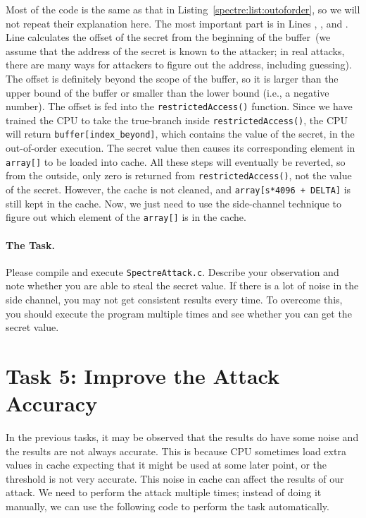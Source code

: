Most of the code is the same as that in Listing~\ref{spectre:list:outoforder}, so
we will not repeat their explanation here. The most important part is 
in Lines , , and . Line 
calculates the offset of the secret from the beginning of the buffer~(we assume that 
the address of the secret is known to the attacker; in real attacks, there are many ways for 
attackers to figure out the address, including guessing).
The offset is definitely beyond the scope of the buffer, so
it is larger than the upper bound of the buffer or smaller than the 
lower bound (i.e., a negative number). The offset
is fed into the \texttt{restrictedAccess()} function.
Since we have trained the CPU to take the true-branch inside
\texttt{restrictedAccess()}, the CPU will return \texttt{buffer[index\_beyond]}, which contains
the value of the secret, in the out-of-order execution. 
The secret value then causes its corresponding element in \texttt{array[]} to
be loaded into cache. All these steps will eventually be reverted, so 
from the outside, only zero is returned from \texttt{restrictedAccess()}, not the value of the secret.
However, the cache is not cleaned, and \texttt{array[s*4096 + DELTA]} is still kept in
the cache. Now, we just need to use the side-channel technique to figure out which element of the
\texttt{array[]} is in the cache.  


\paragraph{The Task.} Please compile and execute 
\texttt{SpectreAttack.c}. Describe your observation and note whether you are able to steal the
secret value. If there is a lot of noise in the side channel, you may not get consistent results 
every time. To overcome this,
you should execute the program multiple times and see whether you can get the secret value. 




\section{Task 5: Improve the Attack Accuracy}


In the previous tasks, it may be observed that the results do have some noise and the results
are not always accurate. This is because CPU sometimes load extra values in cache expecting
that it might be used at some later point, or the threshold is not very accurate. 
This noise in cache can affect the results of our
attack. We need to perform the attack multiple times; instead of doing it manually,
we can use the following code to perform the task automatically.

